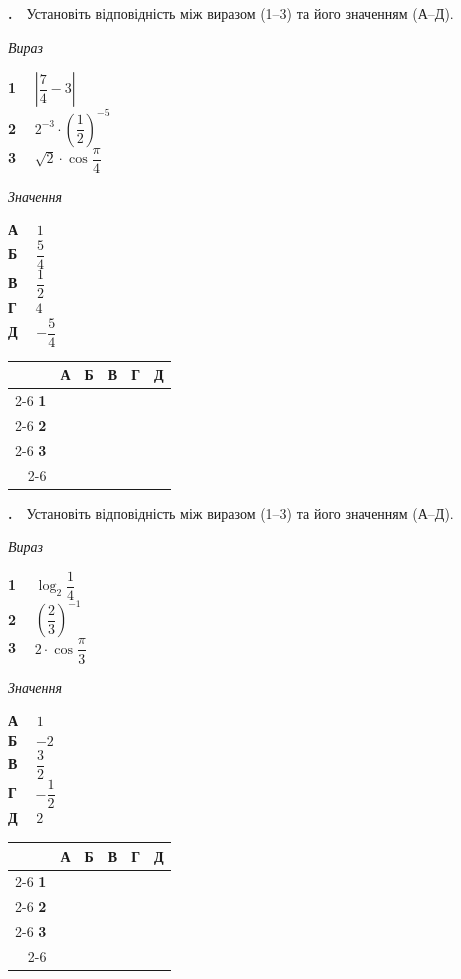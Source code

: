 \documentclass[12pt]{article}
\newcommand{\matchingGrid}{%
    \begingroup
    \renewcommand{\arraystretch}{1.15}
    \setlength{\tabcolsep}{4pt}
    \footnotesize
    \begin{tabular}{r|c|c|c|c|c|}
         \multicolumn{1}{c}{} & \multicolumn{1}{c}{\textbf{А}} & \multicolumn{1}{c}{\textbf{Б}} & \multicolumn{1}{c}{\textbf{В}} & \multicolumn{1}{c}{\textbf{Г}} & \multicolumn{1}{c}{\textbf{Д}} \\ \cline{2-6}
         \textbf{1} & \phantom{X} & \phantom{X} & \phantom{X} & \phantom{X} & \phantom{X} \\ \cline{2-6}
         \textbf{2} & & & & & \\ \cline{2-6}
         \textbf{3} & & & & & \\ \cline{2-6}
    \end{tabular}
    \endgroup
}
\newcounter{zad}
\newcommand{\zadtask}[1]{\stepcounter{zad}\noindent\textbf{\thezad.}\ \ #1\par\vspace{0.2cm}}
\begin{document}
\zadtask{Установіть відповідність між виразом (1--3) та його значенням (А--Д).

\vspace{0.3cm}

\noindent
\begin{minipage}[t]{0.52\textwidth}
\textit{Вираз} \par \vspace{0.2cm}
\textbf{1} \ \ $\left|\dfrac{7}{4} - 3\right|$\\[0.35cm]
\textbf{2} \ \ $2^{-3} \cdot \left(\dfrac{1}{2}\right)^{-5}$\\[0.35cm]
\textbf{3} \ \ $\sqrt{2} \cdot \cos\dfrac{\pi}{4}$
\end{minipage}
\begin{minipage}[t]{0.24\textwidth}
\textit{Значення} \par \vspace{0.2cm}
\textbf{А} \ \ $1$\\[0.15cm]
\textbf{Б} \ \ $\dfrac{5}{4}$\\[0.15cm]
\textbf{В} \ \ $\dfrac{1}{2}$\\[0.15cm]
\textbf{Г} \ \ $4$\\[0.15cm]
\textbf{Д} \ \ $-\dfrac{5}{4}$
\end{minipage}
\hfill
\begin{minipage}[t]{0.22\textwidth}
\vspace{-0.2cm}
\begin{flushright}\matchingGrid\end{flushright}
\end{minipage}
}
\zadtask{Установіть відповідність між виразом (1--3) та його значенням (А--Д).

\vspace{0.3cm}

\noindent
\begin{minipage}[t]{0.52\textwidth}
\textit{Вираз} \par \vspace{0.2cm}
\textbf{1} \ \ $\log_2 \dfrac{1}{4}$\\[0.35cm]
\textbf{2} \ \ $\left(\dfrac{2}{3}\right)^{-1}$\\[0.35cm]
\textbf{3} \ \ $2 \cdot \cos\dfrac{\pi}{3}$
\end{minipage}
\begin{minipage}[t]{0.24\textwidth}
\textit{Значення} \par \vspace{0.2cm}
\textbf{А} \ \ $1$\\[0.15cm]
\textbf{Б} \ \ $-2$\\[0.15cm]
\textbf{В} \ \ $\dfrac{3}{2}$\\[0.15cm]
\textbf{Г} \ \ $-\dfrac{1}{2}$\\[0.15cm]
\textbf{Д} \ \ $2$
\end{minipage}
\hfill
\begin{minipage}[t]{0.22\textwidth}
\vspace{-0.2cm}
\begin{flushright}\matchingGrid\end{flushright}
\end{minipage}
}
\end{document}
